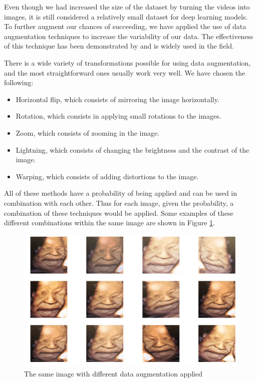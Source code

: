 Even though we had increased the size of the dataset by turning the videos into images, it is still considered a relatively small dataset for deep learning models. To further augment our chances of succeeding, we have applied the use of data augmentation techniques to increase the variability of our data. The effectiveness of this technique has been demonstrated by \cite{abs-1712-04621} and is widely used in the field.

There is a wide variety of transformations possible for using data augmentation, and the most straightforward ones usually work very well. We have chosen the following:

\begin{itemize}
    \item Horizontal flip, which consists of mirroring the image horizontally. 
    \item Rotation, which consists in applying small rotations to the images.
    \item Zoom, which consists of zooming in the image.
    \item Lightning, which consists of changing the brightness and the contrast of the image.
    \item Warping, which consists of adding distortions to the image. 
\end{itemize}

All of these methods have a probability of being applied and can be used in combination with each other. Thus for each image, given the probability, a combination of these techniques would be applied. Some examples of these different combinations within the same image are shown in Figure \ref{fig:data_augmentation}.

\begin{figure}[h!tp]
    \centering
    \includegraphics[width=.9\textwidth]{imgs/chap3_data_augmentation.png}
    \caption{The same image with different data augmentation applied}
    \label{fig:data_augmentation}
\end{figure}

